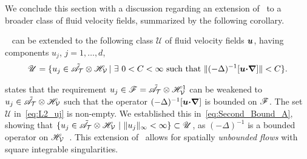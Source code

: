 \documentclass[amsa]{ipart}
\begin{document}
We conclude this section with a discussion regarding an extension
of~ to a broader class of 
fluid velocity fields, summarized by the following corollary.
%
\begin{corollary}~\label{cor:L2_uj}
   can be extended to the
  following class $\mathscr{U}$ of fluid velocity fields $\boldsymbol{u}$,
  having components $u_j$, $j=1,\ldots,d$,
  \begin{align}\label{eq:L2_uj}
    \mathscr{U}
    =\{u_j\in\tilde{\As}_{\Tc}\otimes\Hs_{\Vc} \,|\ \exists \ 0<C<\infty \text{ such that }
                                \|(-\Delta)^{-1}[\vecu\bcdot\bnabla]\|<C\}.
  \end{align}
\end{corollary}
%
 states that the requirement
$u_j\in\mathscr{F}=\tilde{\mathscr{A}}_{\mathcal{T}}\otimes\mathscr{H}^1_{\mathcal{V}}$ can be weakened to
$u_j\in\tilde{\mathscr{A}}_{\mathcal{T}}\otimes\mathscr{H}_{\mathcal{V}}$ such that the operator
$(-\Delta)^{-1}[\boldsymbol{u}\mbox{\boldmath${\cdot}$}\mbox{\boldmath${\nabla}$}]$ is bounded on $\mathscr{F}$. The set
$\mathscr{U}$ in~\eqref{eq:L2_uj} is non-empty. We established this
in~\eqref{eq:Second_Bound_A}, showing that  
$\{u_j\in\tilde{\As}_{\Tc}\otimes\Hs_{\Vc} \ |\ \|u_j\|_{\infty}<\infty\}\subset\mathscr{U}$, as
$(-\Delta)^{-1}$ is a bounded operator on
$\mathscr{H}_{\mathcal{V}}$~\cite{Stakgold:BVP:2000}. This extension
of~ allows for spatially \emph{unbounded
  flows} with square integrable singularities. 
\end{document}
